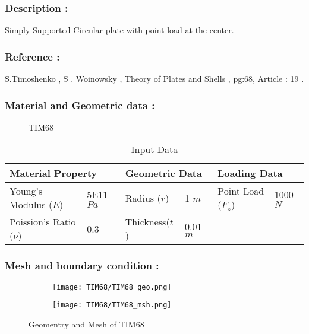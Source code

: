 \documentclass[VM.tex]{subfiles}
\begin{document}
\subsubsection*{Description : }
Simply Supported Circular plate with point load at the center.  
\subsubsection*{Reference : }
S.Timoshenko , S . Woinowsky , Theory of Plates and Shells , pg:68, Article : 19 . 
\subsubsection*{Material and Geometric data : }


\begin{figure}[h!]
\centering

\caption{TIM68} \label{TIM68sch}
\end{figure}
\begin{table}[h!]
\renewcommand{\arraystretch}{1.5}
\centering
\caption{Input Data}
\label{my-labelTIM68}
\begin{tabular}{|ll|ll|ll|}
\hline
\multicolumn{2}{|l|}{\cellcolor[HTML]{C0C0C0}Material Property} & \multicolumn{2}{l|}{\cellcolor[HTML]{C0C0C0}Geometric Data} & \multicolumn{2}{l|}{\cellcolor[HTML]{C0C0C0}Loading Data} \\ \hline  \hline
Young's Modulus ($E$)          & 5E11 $Pa$         & Radius ($r$)        & 1 $m$        & Point Load ($F_z$)        & 1000 $N$         \\
Poission's Ratio ($\nu$)       & 0.3         &  Thickness($t$)     &         0.01 $m$  &         &  \\ 
            \hline
\end{tabular}
\end{table}




\subsubsection*{Mesh and boundary condition : }



\begin{figure}[h!]
\begin{subfigure}{.45\textwidth}
\texttt{[image: TIM68/TIM68\_geo.png]}
\end{subfigure} \hfill
\begin{subfigure}{.45\textwidth}
\texttt{[image: TIM68/TIM68\_msh.png]}
\end{subfigure}
\caption{Geomentry and Mesh of TIM68}
\end{figure}
\end{document}
